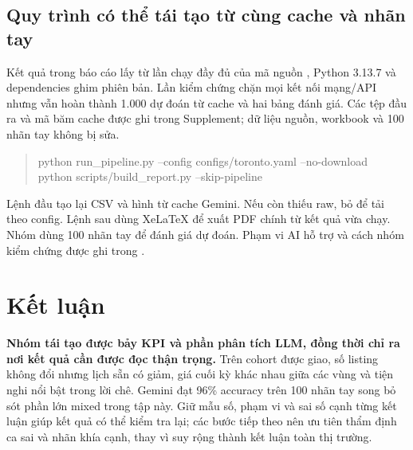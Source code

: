 \documentclass[11pt,a4paper]{article}
\begin{document}
\subsection{Quy trình có thể tái tạo từ cùng cache và nhãn tay}
Kết quả trong báo cáo lấy từ lần chạy đầy đủ của mã nguồn \code{\SourceCommit}, Python 3.13.7 và dependencies ghim phiên bản. Lần kiểm chứng chặn mọi kết nối mạng/API nhưng vẫn hoàn thành 1.000 dự đoán từ cache và hai bảng đánh giá. Các tệp đầu ra và mã băm cache được ghi trong Supplement; dữ liệu nguồn, workbook và 100 nhãn tay không bị sửa.
\begin{quote}\small\ttfamily
python run\_pipeline.py --config configs/toronto.yaml --no-download\\
python scripts/build\_report.py --skip-pipeline
\end{quote}
Lệnh đầu tạo lại CSV và hình từ cache Gemini. Nếu còn thiếu raw, bỏ  để tải theo config. Lệnh sau dùng XeLaTeX để xuất PDF chính từ kết quả vừa chạy. Nhóm dùng 100 nhãn tay để đánh giá dự đoán. Phạm vi AI hỗ trợ và cách nhóm kiểm chứng được ghi trong .

\section{Kết luận}
\textbf{Nhóm tái tạo được bảy KPI và phần phân tích LLM, đồng thời chỉ ra nơi kết quả cần được đọc thận trọng.} Trên cohort được giao, số listing không đổi nhưng lịch sẵn có giảm, giá cuối kỳ khác nhau giữa các vùng và tiện nghi nổi bật trong lời chê. Gemini đạt 96\% accuracy trên 100 nhãn tay song bỏ sót phần lớn mixed trong tập này. Giữ mẫu số, phạm vi và sai số cạnh từng kết luận giúp kết quả có thể kiểm tra lại; các bước tiếp theo nên ưu tiên thẩm định ca sai và nhãn khía cạnh, thay vì suy rộng thành kết luận toàn thị trường.
\end{document}
